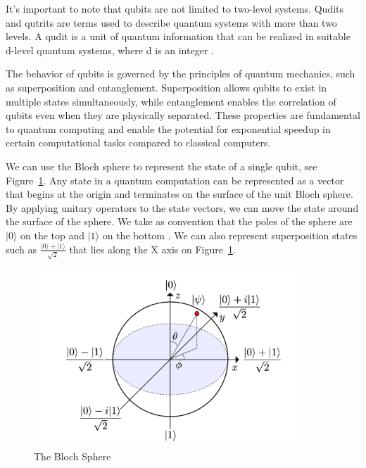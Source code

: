 \documentclass[inscr,ack,preface]{diphdthesis}
\begin{document}
It's important to note that \acrshort{qubit}s are not limited to two-level systems. Qudits and qutrits are terms used to describe quantum systems with more than two levels. A qudit is a unit of quantum information that can be realized in suitable d-level quantum systems, where d is an integer \cite{qudit}.

The behavior of \acrshort{qubit}s is governed by the principles of quantum mechanics, such as superposition and entanglement. Superposition allows \acrshort{qubit}s to exist in multiple states simultaneously, while entanglement enables the correlation of \acrshort{qubit}s even when they are physically separated. These properties are fundamental to quantum computing and enable the potential for exponential speedup in certain computational tasks compared to classical computers.

We can use the Bloch sphere to represent the state of a single \acrshort{qubit}, see Figure~\ref{fig:enter-label}. Any
state in a quantum computation can be represented as a vector that begins at
the origin and terminates on the surface of the unit Bloch sphere. By applying
unitary operators to the state vectors, we can move the state around the surface of the sphere.
We take as convention that the poles of the sphere are $\vert0\rangle$ on the top and $\vert1\rangle$ on the bottom \cite{hidary}.
We can also represent superposition states such as 
\Large $\frac{\lvert 0 \rangle + \lvert 1 \rangle}{\sqrt{2}}$ 
\normalsize that lies along the X axis  on Figure~\ref{fig:enter-label}.
\begin{figure}[ht]
    \includegraphics[width=0.9\textwidth]{bloch.png}
    \caption{The Bloch Sphere}
    \label{fig:enter-label}
\end{figure}

\cite{kockum2014quantum}
\end{document}
